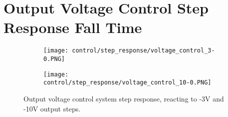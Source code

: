 \section{Output Voltage Control Step Response Fall Time} \label{A:control_step_fall}
\begin{figure}[H]
    \centering
    \begin{subfigure}{0.7\textwidth}
        \texttt{[image: control/step\_response/voltage\_control\_3-0.PNG]}
    \end{subfigure}
    \begin{subfigure}{0.7\textwidth}
        \texttt{[image: control/step\_response/voltage\_control\_10-0.PNG]}
    \end{subfigure}
    \caption{Output voltage control system step response, reacting to -3V and -10V output steps.}
\end{figure}

